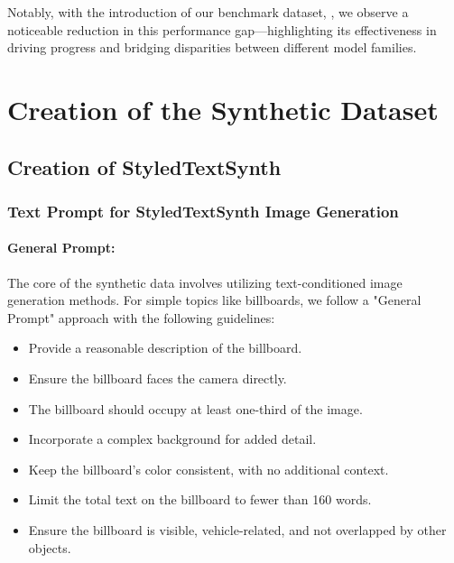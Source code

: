Notably, with the introduction of our benchmark dataset, \EvalDatasetName, we observe a noticeable reduction in this performance gap—highlighting its effectiveness in driving progress and bridging disparities between different model families.









\section{Creation of the Synthetic Dataset}
\label{sec:appendix_create_synthetic}
\subsection{Creation of StyledTextSynth}
\label{sec:appendix_create_mq}

\subsubsection{Text Prompt for StyledTextSynth Image Generation}
\paragraph{General Prompt:}
The core of the synthetic data involves utilizing text-conditioned image generation methods. 
For simple topics like billboards, we follow a "General Prompt" approach with the following guidelines:
\begin{itemize}
    \item Provide a reasonable description of the billboard.
    \item Ensure the billboard faces the camera directly.
    \item The billboard should occupy at least one-third of the image.
    \item Incorporate a complex background for added detail.
    \item Keep the billboard's color consistent, with no additional context.
    \item Limit the total text on the billboard to fewer than 160 words.
    \item Ensure the billboard is visible, vehicle-related, and not overlapped by other objects.
\end{itemize}

